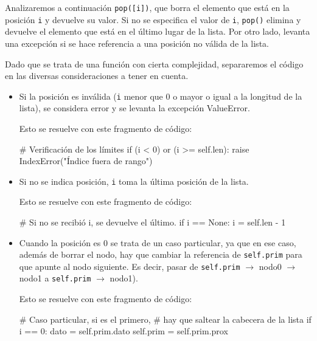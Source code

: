 Analizaremos a continuación \lstinline|pop([i])|, que borra el elemento que
está en la posición \lstinline!i! y devuelve su valor. Si no se especifica
el valor de \lstinline!i!, \lstinline|pop()| elimina y devuelve el elemento
que está en el último lugar de la lista.  Por otro lado, levanta una
excepción si se hace referencia a una posición no válida de la lista.

Dado que se trata de una función con cierta complejidad, separaremos el
código en las diversas consideraciones a tener en cuenta.

\begin{itemize}

\item Si la posición es inválida (\lstinline!i! menor que $0$ o mayor o
igual a la longitud de la lista), se considera error y se levanta la
excepción ValueError.

Esto se resuelve con este fragmento de código:

\begin{codigo-python-sn}
        # Verificación de los límites
        if (i < 0) or (i >= self.len):
            raise IndexError("Índice fuera de rango")
\end{codigo-python-sn}

\item Si no se indica posición, \lstinline!i! toma la última posición de la lista.

Esto se resuelve con este fragmento de código:
\begin{codigo-python-sn}
        # Si no se recibió i, se devuelve el último.
        if i == None:
            i = self.len - 1
\end{codigo-python-sn}

\item Cuando la posición es $0$ se trata de un caso particular, ya que en ese
caso, además de borrar el nodo, hay que cambiar la referencia de
\lstinline!self.prim! para que apunte al nodo siguiente.  Es decir, pasar de
\lstinline!self.prim! $\rightarrow$ nodo0 $\rightarrow$ nodo1 a
\lstinline!self.prim! $\rightarrow$ nodo1).

Esto se resuelve con este fragmento de código:

\begin{codigo-python-sn}
        # Caso particular, si es el primero,
        # hay que saltear la cabecera de la lista
        if i == 0:
            dato = self.prim.dato
            self.prim = self.prim.prox
\end{codigo-python-sn}


\end{itemize}
